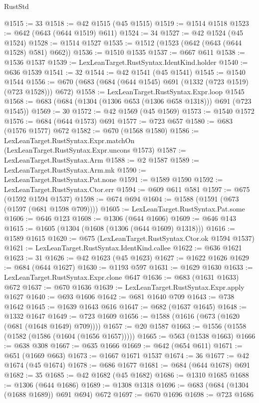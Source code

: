 \begin{lexlean}{RustStd}
\begin{coremodule}
@1515 := 33
@1518 := @42 @1515 (@45 @1515)
@1519 := @1514 @1518
@1523 := @642 (@643 (@644 @1519) @611)
@1524 := 34
@1527 := @42 @1524 (@45 @1524)
@1528 := @1514 @1527
@1535 := @1512 (@1523 (@642 (@643 (@644 @1528) @581) @662))
@1536 := @1510 @1535
@1537 := @667 @611
@1538 := @1536 @1537
@1539 := LexLeanTarget.RustSyntax.IdentKind.holder
@1540 := @636 @1539
@1541 := 32
@1544 := @42 @1541 (@45 @1541)
@1545 := @1540 @1544
@1556 := @670 (@683 (@684 (@644 @1545) @691 (@1332 (@723 @1519) (@723 @1528))) @672)
@1558 := LexLeanTarget.RustSyntax.Expr.loop @1545
@1568 := @683 (@684 (@1304 (@1306 @653 (@1306 @658 @1318))) @691 (@723 @1545))
@1569 := 30
@1572 := @42 @1569 (@45 @1569)
@1573 := @1540 @1572
@1576 := @684 (@644 @1573) @691
@1577 := @723 @657
@1580 := @683 (@1576 @1577) @672
@1582 := @670 (@1568 @1580)
@1586 := LexLeanTarget.RustSyntax.Expr.matchOn (LexLeanTarget.RustSyntax.Expr.uncons @1573)
@1587 := LexLeanTarget.RustSyntax.Arm
@1588 := @2 @1587
@1589 := LexLeanTarget.RustSyntax.Arm.mk
@1590 := LexLeanTarget.RustSyntax.Pat.none
@1591 := @1589 @1590
@1592 := LexLeanTarget.RustSyntax.Ctor.err
@1594 := @609 @611 @581
@1597 := @675 (@1592 @1594 @1537)
@1598 := @674 @694
@1604 := @1588 (@1591 (@673 (@1597 (@681 @1598 @709))))
@1605 := LexLeanTarget.RustSyntax.Pat.some
@1606 := @646 @123
@1608 := @1306 (@644 @1606)
@1609 := @646 @143
@1615 := @1605 (@1304 (@1608 (@1306 (@644 @1609) @1318)))
@1616 := @1589 @1615
@1620 := @675 (LexLeanTarget.RustSyntax.Ctor.ok @1594 @1537)
@1621 := LexLeanTarget.RustSyntax.IdentKind.callee
@1622 := @636 @1621
@1623 := 31
@1626 := @42 @1623 (@45 @1623)
@1627 := @1622 @1626
@1629 := @684 (@644 @1627)
@1630 := @1193 @597
@1631 := @1629 @1630
@1633 := LexLeanTarget.RustSyntax.Expr.clone @647
@1636 := @683 (@1631 @1633) @672
@1637 := @670 @1636
@1639 := LexLeanTarget.RustSyntax.Expr.apply @1627
@1640 := @693 @1606
@1642 := @681 @1640 @709
@1643 := @738 @1642
@1645 := @1639 @1643 @616
@1647 := @682 (@1637 @1645)
@1648 := @1332 @1647
@1649 := @723 @1609
@1656 := @1588 (@1616 (@673 (@1620 (@681 (@1648 @1649) @709))))
@1657 := @20 @1587
@1663 := @1556 (@1558 (@1582 (@1586 (@1604 (@1656 @1657)))))
@1665 := @563 (@1538 @1663)
@1666 := @638 @308
@1667 := @635 @1666
@1669 := @642 (@654 @611)
@1671 := @651 (@1669 @663)
@1673 := @1667 @1671 @1537
@1674 := 36
@1677 := @42 @1674 (@45 @1674)
@1678 := @686 @1677
@1681 := @684 (@644 @1678) @691
@1682 := 35
@1685 := @42 @1682 (@45 @1682)
@1686 := @1310 @1685
@1688 := @1306 (@644 @1686)
@1689 := @1308 @1318
@1696 := @683 (@684 (@1304 (@1688 @1689)) @691 @694) @672
@1697 := @670 @1696
@1698 := @723 @1686

\end{coremodule}
\end{lexlean}
